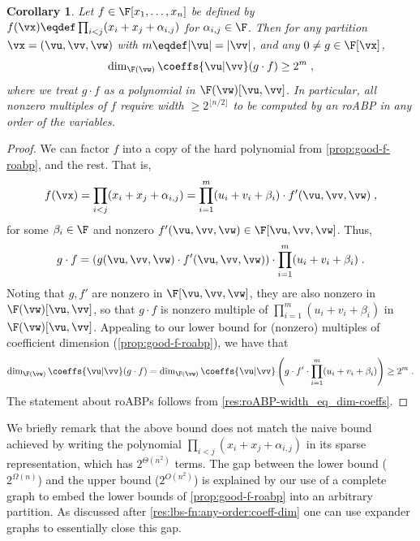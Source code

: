 \documentclass[11pt]{article}
\numberwithin{equation}{section}
\newtheorem{corollary}[theorem]{Corollary}
\theoremstyle{definition}
\theoremstyle{plain}
\begin{document}
\begin{corollary}\label{cor:lbs-mult:every-partition}
        Let $f\in\F[x_1,\ldots,x_n]$ be defined by $f(\vx)\eqdef\prod_{i<j}(x_i+x_j+\alpha_{i,j})$ for $\alpha_{i,j}\in\F$.  Then for any partition $\vx=(\vu,\vv,\vw)$ with $m\eqdef|\vu|=|\vv|$, and any $0\ne g\in\F[\vx]$,
        \[
                \dim_{\F(\vw)}\coeffs{\vu|\vv}(g\cdot f)\ge 2^m
                \;,
        \]
        where we treat $g\cdot f$ as a polynomial in $\F(\vw)[\vu,\vv]$.  In particular, all nonzero multiples of $f$ require width $\ge 2^{\lfloor n/2 \rfloor}$ to be computed by an roABP in any order of the variables.
\end{corollary}
\begin{proof}
        We can factor $f$ into a copy of the hard polynomial from \autoref{prop:good-f-roabp}, and the rest.  That is,
        \begin{align*}
                f(\vx)
                =\prod_{i<j} (x_i+x_j+\alpha_{i,j})
                =\prod_{i=1}^m(u_i+v_i+\beta_i)\cdot f'(\vu,\vv,\vw)
                \;,
        \end{align*}
        for some $\beta_i\in\F$ and nonzero $f'(\vu,\vv,\vw)\in\F[\vu,\vv,\vw]$.  Thus,
        \[
                g\cdot f
                =\left(g(\vu,\vv,\vw)\cdot f'(\vu,\vv,\vw)\right)\cdot \prod_{i=1}^m(u_i+v_i+\beta_i)
                \;.
        \]
        Noting that $g,f'$ are nonzero in $\F[\vu,\vv,\vw]$, they are also nonzero in $\F(\vw)[\vu,\vv]$, so that $g\cdot f$ is nonzero multiple of $\prod_{i=1}^m(u_i+v_i+\beta_i)$ in $\F(\vw)[\vu,\vv]$.  Appealing to our lower bound for (nonzero) multiples of coefficient dimension (\autoref{prop:good-f-roabp}), we have that
        \[
                \dim_{\F(\vw)}\coeffs{\vu|\vv}(g\cdot f)
                =\dim_{\F(\vw)}\coeffs{\vu|\vv}\left(g\cdot f'\cdot \prod_{i=1}^m(u_i+v_i+\beta_i)\right)
                \ge 2^m
                \;.
        \]
        The statement about roABPs follows from \autoref{res:roABP-width_eq_dim-coeffs}.
\end{proof}

We briefly remark that the above bound does not match the naive bound achieved by writing the polynomial $\prod_{i<j}(x_i+x_j+\alpha_{i,j})$ in its sparse representation, which has $2^{\Theta(n^2)}$ terms.  The gap between the lower bound ($2^{\Omega(n)}$) and the upper bound ($2^{O(n^2)}$) is explained by our use of a complete graph to embed the lower bounds of \autoref{prop:good-f-roabp} into an arbitrary partition.  As discussed after \autoref{res:lbs-fn:any-order:coeff-dim} one can use expander graphs to essentially close this gap.
\end{document}
